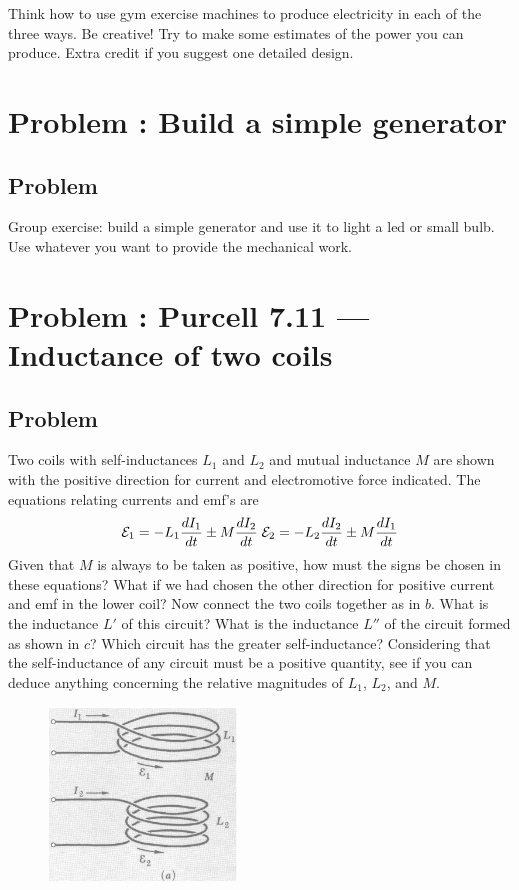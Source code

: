\documentclass[solutions]{esg8022pset}
\begin{document}
\noindent Think how to use gym exercise machines to produce electricity in each of the three ways. Be creative!
Try to make some estimates of the power you can produce. Extra credit if you suggest one detailed design.
\section{Problem \thesection: Build a simple generator}
\subsection{Problem}
 Group exercise: build a simple generator and use it to light a led or small bulb. Use whatever you want to
  provide the mechanical work.
 
\section{Problem \thesection: Purcell 7.11 --- Inductance of two coils}
\subsection{Problem}
Two coils with self-inductances $L_1$ and $L_2$ and mutual inductance $M$  are shown with the positive direction for current and electromotive force indicated. The equations relating currents and emf's are
\begin{equation}
{\cal E}_1 = -L_1\frac{dI_1}{dt}\pm M\frac{dI_2}{dt} \; {\cal E}_2 = -L_2\frac{dI_2}{dt}\pm M\frac{dI_1}{dt}
\end{equation}
Given that $M$ is always to be taken as positive, how must the signs be chosen in these equations? What if we had chosen the other direction for positive current and emf in the lower coil? Now connect the two coils together as in $b$. What is the inductance $L'$ of this circuit? What is the inductance $L''$ of the circuit formed as shown in $c$? Which circuit has the greater self-inductance? Considering that the self-inductance of any circuit must be a positive quantity, see if you can deduce anything concerning the relative magnitudes of $L_1$, $L_2$, and $M$.


  \begin{figure}[H]
    \centering
    \includegraphics[width = 5cm]{pu711a}
    \label{fig:pu711a}
  \end{figure}
\end{document}
